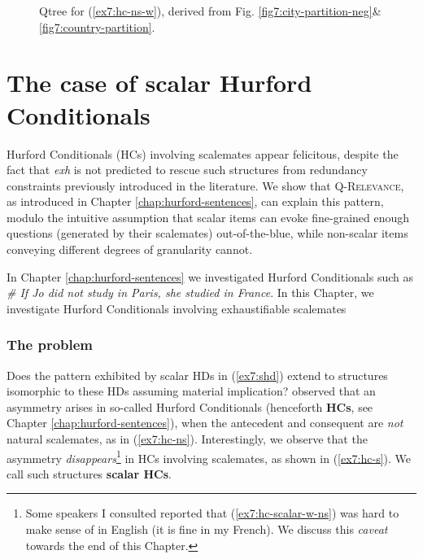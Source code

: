 \begin{figure}[H]
	\centering
	\caption{Qtree for (\ref{ex7:hc-ns-w}), derived from Fig. \ref{fig7:city-partition-neg}\&\ref{fig7:country-partition}.}\label{fig7:hc-non-scalar-ns-w}
\end{figure}

\section{The case of scalar Hurford Conditionals}

Hurford Conditionals (HCs) involving scalemates appear felicitous, despite the fact that \textit{exh} is not predicted to rescue such structures from redundancy constraints previously introduced in the literature. We show that \textsc{Q-Relevance}, as introduced in Chapter \ref{chap:hurford-sentences}, can explain this pattern, modulo the intuitive assumption that scalar items can evoke fine-grained enough questions (generated by their scalemates) out-of-the-blue, while non-scalar items conveying different degrees of granularity cannot.

In Chapter \ref{chap:hurford-sentences} we investigated Hurford Conditionals such as \textit{\# If Jo did not study in Paris, she studied in France}. In this Chapter, we investigate Hurford Conditionals involving exhaustifiable scalemates


\subsubsection{The problem}
Does the pattern exhibited by scalar HDs in (\ref{ex7:shd}) extend to structures isomorphic to these HDs assuming material implication? \citet{Mandelkern2018} observed that an asymmetry arises in so-called Hurford Conditionals (henceforth \textbf{HCs}, see Chapter \ref{chap:hurford-sentences}), when the antecedent and consequent are \textit{not} natural scalemates, as in (\ref{ex7:hc-ns}). Interestingly, we observe that the asymmetry \textit{disappears}\footnote{Some speakers I consulted reported that (\ref{ex7:hc-scalar-w-ns}) was hard to make sense of in English (it is fine in my French). We discuss this \textit{caveat} towards the end of this Chapter.} in HCs involving scalemates, as shown in (\ref{ex7:hc-s}). We call such structures \textbf{scalar HCs}.

